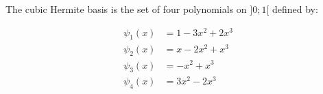 \bexo

The cubic Hermite basis is the set of four polynomials on $]0;1[$ defined by:

\begin{align}
	\psi_1(x)&=1-3x^2+2x^3\\
	\psi_2(x)&=x-2x^2+x^3\\
	\psi_3(x)&=-x^2+x^3\\
	\psi_4(x)&=3x^2-2x^3 
\end{align}


\eexo

\solution{

}